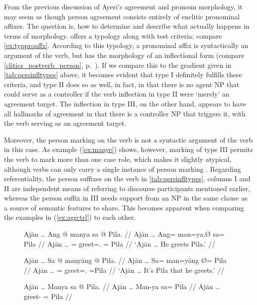 From the previous discussion of Ayeri's agreement and pronoun morphology, it
may seem as though person agreement consists entirely of enclitic pronominal
affixes. The question is, how to determine and describe what actually happens
in terms of morphology. \citet{corbett2006} offers a typology along with test
criteria; compare \autoref{ex:typproaffx}. According to this typology, a
pronominal affix is syntactically an argument of the verb, but has the
morphology of an inflectional form (compare \autoref{clitics_postverb_person},
p.~\pageref{clitics_postverb_person}). If we compare this to the gradient given
in \autoref{tab:persinfltypes} above, it becomes evident that type I definitely
fulfills these criteria, and type II does so as well, in fact, in that there is
no agent NP that could serve as a controller if the verb inflection in type II
were `merely' an agreement target. The inflection in type III, on the other
hand, appears to have all hallmarks of agreement in that there is a controller
NP that triggers it, with the verb serving as an agreement target.

Moreover, the person marking on the verb is not a syntactic argument of the
verb in this case. As example (\ref{ex:manye}) shows, however, marking of type
III permits the verb to mark more than one case role, which makes it slightly
atypical, although verbs can only carry a single instance of person marking
\citep[103]{corbett2006}. Regarding referentiality, the person suffixes on the
verb in \autoref{tab:persinfltypes}, columns I and II are independent means of
referring to discourse participants mentioned earlier, whereas the person
suffix in III needs support from an NP in the same clause as a source of
semantic features to share. This becomes apparent when comparing the examples
in (\ref{ex:agrctrl}) to each other.

\begin{figure}[h]
\pex\label{ex:agrctrl} %
\a\label{ex:agttopclit}\begingl
	\gla Ajān … Ang @ manya sa @ Pila. //
	\glb Ajān … Ang= man=ya.Ø sa= ​Pila //
	\glc Ajān … \AgtT{}= greet=\TsgM{}.\Top{} \Parg{}= ​Pila //
	\glft `Ajān … He greets Pila.' //
\endgl

\a\label{ex:agtproclit}\begingl
	\gla Ajān … Sa @ manyāng {} @ Pila. //
	\glb Ajān … Sa= man=yāng Ø= Pila //
	\glc Ajān … \PatT{}= greet=\TsgM{}.\Aarg{} \Top{}= ​Pila //
	\glft `Ajān … It's Pila that he greets.' //
\endgl

\a\label{ex:wrongagr}\ljudge* \begingl
	\gla Ajān … Manya sa @ Pila. //
	\glb Ajān … Man-ya sa= ​Pila //
	\glc Ajān … greet-\TsgM{} \Parg{}= ​Pila //
\endgl
\xe
\end{figure}

